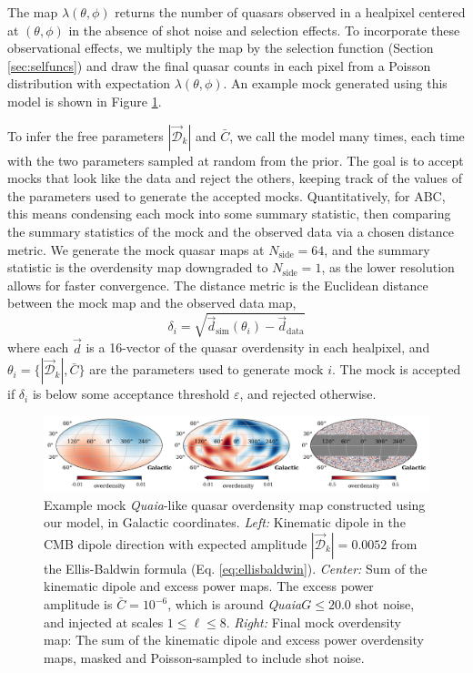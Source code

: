 \documentclass[modern]{aastex631}
\newcommand{\quaia}{\textsl{Quaia}\xspace}
\newcommand{\nside}{N_\mathrm{side}}
\newcommand{\dipamp}{|\vec{\mathcal{D}}_k|}
\begin{document}
The map $\lambda(\theta,\phi)$ returns the number of quasars observed in a healpixel centered at $(\theta,\phi)$ in the absence of shot noise and selection effects.
To incorporate these observational effects, we multiply the map by the selection function (Section \ref{sec:selfuncs}) and draw the final quasar counts in each pixel from a Poisson distribution with expectation $\lambda(\theta,\phi)$.
An example mock generated using this model is shown in Figure \ref{fig:example_mock}.

To infer the free parameters $\dipamp$ and $\bar C$, we call the model many times, each time with the two parameters sampled at random from the prior.
The goal is to accept mocks that look like the data and reject the others, keeping track of the values of the parameters used to generate the accepted mocks.
Quantitatively, for ABC, this means condensing each mock into some summary statistic, then comparing the summary statistics of the mock and the observed data via a chosen distance metric.
We generate the mock quasar maps at $\nside=64$, and the summary statistic is the overdensity map downgraded to $\nside=1$, as the lower resolution allows for faster convergence.
The distance metric is the Euclidean distance between the mock map and the observed data map,
\begin{equation}
    \delta_i = \sqrt{\vec d_\mathrm{sim}(\theta_i)-\vec d_\mathrm{data}}
\end{equation}
where each $\vec d$ is a 16-vector of the quasar overdensity in each healpixel, and $\theta_i=\{\dipamp,\bar C\}$ are the parameters used to generate mock $i$.
The mock is accepted if $\delta_i$ is below some acceptance threshold $\varepsilon$, and rejected otherwise.

\begin{figure}
    \centering
    \includegraphics[width=\textwidth]{images/example_mock.png}
    \caption{Example mock \quaia-like quasar overdensity map constructed using our model, in Galactic coordinates. \textit{Left:} Kinematic dipole in the CMB dipole direction with expected amplitude $\dipamp=0.0052$ from the Ellis-Baldwin formula (Eq. \ref{eq:ellisbaldwin}). \textit{Center:} Sum of the kinematic dipole and excess power maps. The excess power amplitude is $\bar C = 10^{-6}$, which is around \quaia $G\le 20.0$ shot noise, and injected at scales $1\le\ell\le 8$. \textit{Right:} Final mock overdensity map: The sum of the kinematic dipole and excess power overdensity maps, masked and Poisson-sampled to include shot noise.}
    \label{fig:example_mock}
\end{figure}
\end{document}
